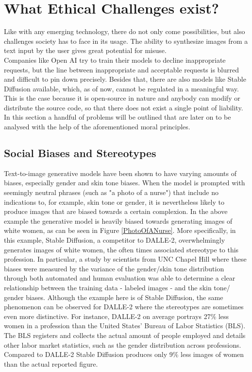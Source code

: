 \documentclass[10pt,twocolumn,twoside]{osajnl}
\begin{document}
\section{What Ethical Challenges exist?}
Like with any emerging technology, there do not only come possibilities, but also challenges society has to face in its usage.
The ability to synthesize images from a text input by the user gives great potential for misuse. \\
Companies like Open AI try to train their models to decline inappropriate requests, but the line between inappropriate and acceptable requests is blurred and difficult to pin down precisely. 
Besides that, there are also models like Stable Diffusion \cite{StableDiffusion} available, which, as of now, cannot be regulated in a meaningful way. 
This is the case because it is open-source in nature and anybody can modify or distribute the source code, so that there does not exist a single point of liability.
In this section a handful of problems will be outlined that are later on to be analysed with the help of the aforementioned moral principles.

\subsection{Social Biases and Stereotypes}
Text-to-image generative models have been shown to have varying amounts of biases, especially gender and skin tone biases. 
When the model is prompted with seemingly neutral phrases (such as "a photo of a nurse") that include no indications to, for example, skin tone or gender, it is nevertheless likely to produce images that are biased towards a certain complexion.
In the above example the generative model is heavily biased towards generating images of white women, as can be seen in Figure \ref{PhotoOfANurse}. 
More specifically, in this example, Stable Diffusion, a competitor to DALLE-2, overwhelmingly generates images of white women, the often times associated stereotype to this profession.
In particular, a study by scientists from UNC Chapel Hill where these biases were measured by the variance of the gender/skin tone distribution through both automated and human evaluation
was able to determine a clear relationship between the training data - labeled images - and the skin tone/ gender biases\cite{DallEval}. 
Although the example here is of Stable Diffusion, the same phenomenon can be observed for DALLE-2 \cite{DalleSocialBias} where the stereotypes are sometimes even more distinctive. 
For instance, DALLE-2 on average portrays 27\% less women in a profession than the United States' Bureau of Labor Statistics (BLS). The BLS registers and collects the actual 
amount of people employed and details other labor market statistics, such as the gender distribution across professions. Compared to DALLE-2 Stable Diffusion produces only 9\% less images of women than the actual 
reported figure\cite{stablebias}. 
\end{document}
